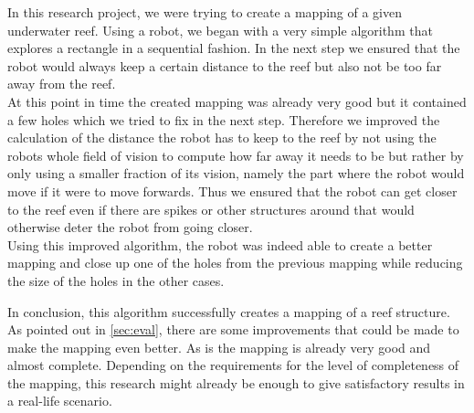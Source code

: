 \documentclass[twoside, 12pt]{article}
\begin{document}
In this research project, we were trying to create a mapping of a given underwater reef. Using a robot, we began with a very simple algorithm that explores a rectangle in a sequential fashion. In the next step we ensured that the robot would always keep a certain distance to the reef but also not be too far away from the reef.\\

At this point in time the created mapping was already very good but it contained a few holes which we tried to fix in the next step. Therefore we improved the calculation of the distance the robot has to keep to the reef by not using the robots whole field of vision to compute how far away it needs to be but rather by only using a smaller fraction of its vision, namely the part where the robot would move if it were to move forwards. Thus we ensured that the robot can get closer to the reef even if there are spikes or other structures around that would otherwise deter the robot from going closer.\\

Using this improved algorithm, the robot was indeed able to create a better mapping and close up one of the holes from the previous mapping while reducing the size of the holes in the other cases.\\


In conclusion, this algorithm successfully creates a mapping of a reef structure. As pointed out in \autoref{sec:eval}, there are some improvements that could be made to make the mapping even better. As is the mapping is already very good and almost complete. Depending on the requirements for the level of completeness of the mapping, this research might already be enough to give satisfactory results in a real-life scenario.\\

\newpage

{}

\end{document}
